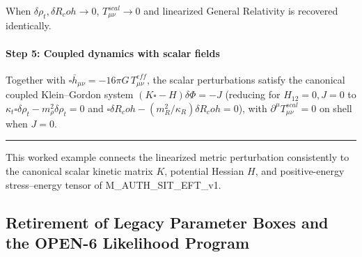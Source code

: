 \documentclass[american,11pt,letterpaper]{article}
\newcommand{\Rcoh}{R_{\mathrm{coh}}}
\def\mathrm#1{#1}%
\def\texttt#1{#1}%
\def\Rcoh{R_coh}%
\begin{document}
When $\delta\rho_t, \delta\Rcoh \to 0$, $T_{\mu\nu}^{\mathrm{scal}} \to 0$ and linearized General Relativity is recovered identically.

\paragraph{Step 5: Coupled dynamics with scalar fields}

Together with $\square\bar{h}_{\mu\nu} = -16\pi G\,T_{\mu\nu}^{\mathrm{eff}}$, the scalar perturbations satisfy the canonical coupled Klein--Gordon system $(K\square - H)\delta\Phi = -J$ (reducing for $H_{12}=0, J=0$ to $\kappa_t\square\delta\rho_t - m_\rho^2\delta\rho_t = 0$ and $\square\delta\Rcoh - (m_R^2/\kappa_R)\delta\Rcoh = 0$), with $\partial^\mu T_{\mu\nu}^{\mathrm{scal}} = 0$ on shell when $J = 0$.

\medskip\hrule\medskip
This worked example connects the linearized metric perturbation consistently to the canonical scalar kinetic matrix $K$, potential Hessian $H$, and positive-energy stress--energy tensor of \texttt{M\_AUTH\_SIT\_EFT\_v1}.

\subsection{Retirement of Legacy Parameter Boxes and the \texttt{OPEN-6} Likelihood Program}
\end{document}
